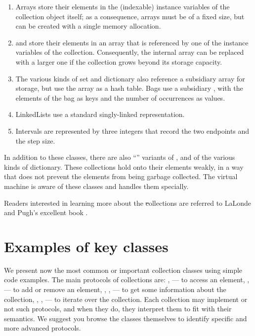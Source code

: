 \documentclass[a4paper,10pt,twoside]{book}
\begin{document}
\begin{enumerate}
  \item Arrays store their elements in the (indexable) instance variables of the collection object itself; as a consequence, arrays must be of a fixed size, but can be created with a single memory allocation.
  \item {} and  store their elements in an array that is referenced by one of the instance variables of the collection.
Consequently, the internal array can be replaced with a larger one if the collection grows beyond its storage capacity.
  \item The various kinds of set and dictionary also reference a subsidiary array for storage, but use the array as a hash table.  Bags use a subsidiary , with the elements of the bag as keys and the number of occurrences as values.
  \item LinkedLists use a standard singly-linked representation.
  \item Intervals are represented by three integers that record the two endpoints and the step size.
\end{enumerate}
In addition to these classes, there are also ``'' variants of ,  and of the various kinds of dictionary.  These collections hold onto their elements weakly, \ie in a way that does not prevent the elements from being garbage collected.
The \squeak virtual machine is aware of these classes and handles them specially.

Readers interested in learning more about the \st collections are referred to LaLonde and Pugh's excellent book \cite{LaLo90a}.

\section{Examples of key classes}
We present now the most common or important collection classes using simple code examples. 
The main protocols of collections are: ,  --- to access an element, ,  --- to add or remove an element, , ,  --- to get some information about the collection, , ,  --- to iterate over the collection. 
Each collection may implement or not such protocols, and when they do, they interpret them to fit with their semantics. We suggest you browse the classes themselves to identify specific and more advanced protocols.
\end{document}
